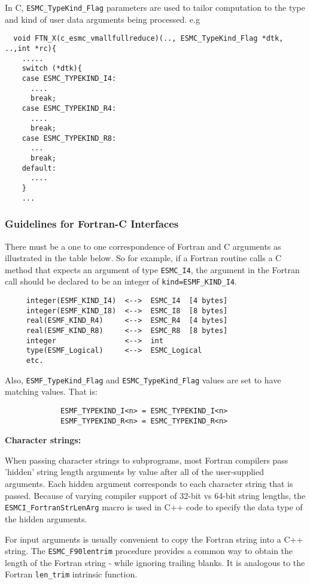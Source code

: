 In C, {\tt ESMC\_TypeKind\_Flag} parameters are used to tailor computation to the type and kind of user data arguments being processed. e.g
\begin{verbatim}
  void FTN_X(c_esmc_vmallfullreduce)(.., ESMC_TypeKind_Flag *dtk, ..,int *rc){
    .....      
    switch (*dtk){
    case ESMC_TYPEKIND_I4:
      ....
      break;
    case ESMC_TYPEKIND_R4:
      ....
      break;
    case ESMC_TYPEKIND_R8:
      ...         
      break;
    default:
      ....
    }
    ...
\end{verbatim}

\subsubsection{Guidelines for Fortran-C Interfaces}

There must be a one to one correspondence of Fortran and C arguments as illustrated in the table below. So for example, if a Fortran routine calls a C method that expects an argument of type {\tt ESMC\_I4}, the argument in the Fortran call should be declared to be an integer of {\tt kind=ESMF\_KIND\_I4}.
\begin{verbatim}
     integer(ESMF_KIND_I4)  <-->  ESMC_I4  [4 bytes]
     integer(ESMF_KIND_I8)  <-->  ESMC_I8  [8 bytes]
     real(ESMF_KIND_R4)     <-->  ESMC_R4  [4 bytes]
     real(ESMF_KIND_R8)     <-->  ESMC_R8  [8 bytes]
     integer                <-->  int
     type(ESMF_Logical)     <-->  ESMC_Logical
     etc.
\end{verbatim}
Also, {\tt ESMF\_TypeKind\_Flag} and {\tt ESMC\_TypeKind\_Flag} values are set to have matching values. That is:
\begin{verbatim}
             ESMF_TYPEKIND_I<n> = ESMC_TYPEKIND_I<n>
             ESMF_TYPEKIND_R<n> = ESMC_TYPEKIND_R<n>
\end{verbatim}


{\bf Character strings:}

When passing character strings to subprograms, most Fortran compilers pass
'hidden' string length arguments by value after all of the user-supplied arguments.
Each hidden argument corresponds to each character string that is passed.
Because of varying compiler support of 32-bit vs 64-bit string lengths,
the {\tt ESMCI\_FortranStrLenArg} macro is used in C++ code to specify the
data type of the hidden arguments.

For input arguments is usually convenient to copy the Fortran string into a
C++ string.  The {\tt ESMC\_F90lentrim} procedure provides a common way
to obtain the length of the Fortran string - while ignoring trailing blanks.
It is analogous to the Fortran {\tt len\_trim} intrinsic function.

